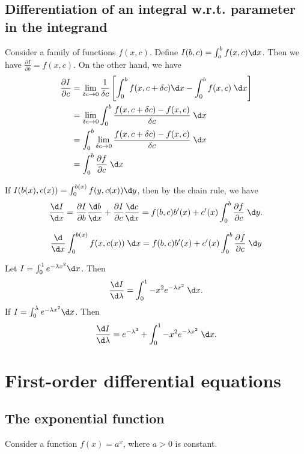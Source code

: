 \documentclass[a4paper]{article}
\begin{document}
\subsection{Differentiation of an integral w.r.t. parameter in the integrand}
Consider a family of functions $f(x, c)$. Define $I(b, c) = \int_a^bf(x, c)\d x$. Then we have $\frac{\partial I}{\partial b} = f(x, c)$. On the other hand, we have
\begin{align*}
  \frac{\partial I}{\partial c} &= \lim_{\delta c\to 0}\frac{1}{\delta c}\left[\int_0^bf(x, c + \delta c)\d x - \int_0^b f(x, c)\;\d x\right]\\
  &= \lim_{\delta c\to 0}\int_0^b\frac{f(x, c + \delta c) - f(x, c)}{\delta c}\;\d x\\
  &= \int_0^b\lim_{\delta c\to 0}\frac{f(x, c + \delta c) - f(x, c)}{\delta c}\;\d x\\
  &= \int_0^b\frac{\partial f}{\partial c}\;\d x
\end{align*}

If $I(b(x), c(x)) = \int_0^{b(x)} f(y, c(x))\d y$, then by the chain rule, we have
\[
\frac{\d I}{\d x} = \frac{\partial I}{\partial b}\frac{\d b}{\d x} + \frac{\partial I}{\partial c}\frac{\d c}{\d x} = f(b, c)b'(x) + c'(x) \int_0^b\frac{\partial f}{\partial c}\;\d y.
\]

\begin{thm}
  \[
  \frac{\d}{\d x} \int_{0}^{b(x)} f(x, c(x))\;\d x= f(b, c)b'(x) + c'(x)\int_0^b \frac{\partial f}{\partial c}\;\d y
  \]
\end{thm}
\begin{eg}
  Let $I = \int_0^1 e^{-\lambda x^2}\d x$. Then
  \[
  \frac{\d I}{\d \lambda} = \int_0^1-x^2e^{-\lambda x^2}\;\d x.
  \]
  If $I = \int_0^\lambda e^{-\lambda x^2}\d x$. Then
  \[
  \frac{\d I}{\d \lambda} = e^{-\lambda^3} + \int_0^1-x^2e^{-\lambda x^2}\;\d x.
  \]
\end{eg}

\section{First-order differential equations}
\subsection{The exponential function}
Consider a function $f(x) = a^x$, where $a>0$ is constant. 

\begin{center}
\end{center}
\end{document}

